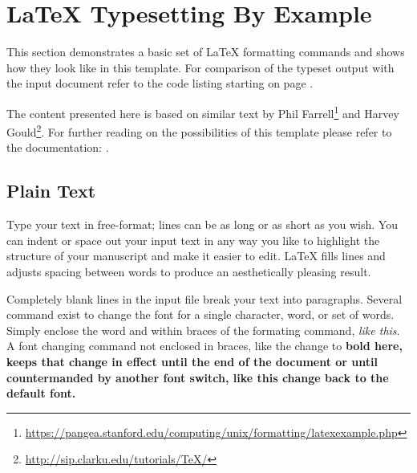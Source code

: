 


%


\section{LaTeX Typesetting By Example}
\label{sec:example:tutorial}
This section demonstrates a basic set of LaTeX formatting commands and shows how they look like in this template. For comparison of the typeset output with the input document refer to the code listing starting on page \pageref{sec:example:code}.

The content presented here is based on similar text by Phil Farrell\footnote{\url{https://pangea.stanford.edu/computing/unix/formatting/latexexample.php}} and Harvey Gould\footnote{\url{http://sip.clarku.edu/tutorials/TeX/}}.
For further reading on the possibilities of this template please refer to the documentation: .

\subsection{Plain Text}
\label{sec:example:PlainText}

Type your text in free-format; lines can be as long
or as short as you wish.
        You can indent         or space out
        your input 
            text in 
                any way you like to highlight the structure
        of your manuscript and make it easier to edit.
LaTeX fills lines and adjusts spacing between words to produce an
aesthetically pleasing result.

Completely blank lines in the input file break your text into
paragraphs.
Several command exist to change the font for a single character, word, or set of words. Simply enclose the word and within braces of the formating command, 
\emph{like this}.
A font changing command not enclosed in braces, like the change to \bfseries 
bold here, keeps that change in effect until the end of the document or
until countermanded by another font switch, like this change back to 
\normalfont the default font. 

